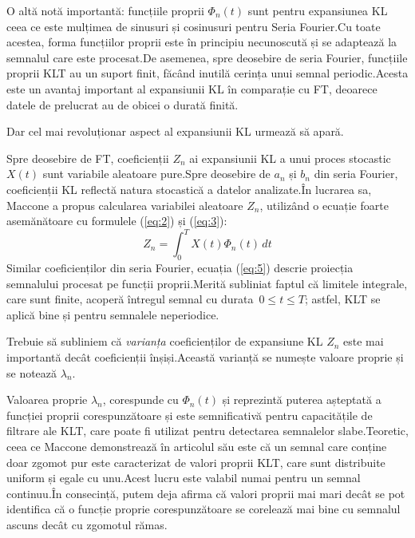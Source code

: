 \documentclass[12pt]{report}
\begin{document}
O altă notă importantă: funcțiile proprii $\Phi_n(t)$ sunt pentru expansiunea KL ceea ce este mulțimea de sinusuri și cosinusuri pentru
Seria Fourier.\@ Cu toate acestea, forma funcțiilor proprii este în principiu necunoscută și se adaptează la semnalul care este procesat.\@ De asemenea, spre deosebire de seria Fourier, funcțiile proprii KLT au un suport finit, făcând inutilă cerința unui semnal periodic.\@ Acesta este un avantaj important al expansiunii KL în comparație cu FT, deoarece datele de prelucrat au de obicei o durată finită.

Dar cel mai revoluționar aspect al expansiunii KL urmează să apară.

Spre deosebire de FT, coeficienții $Z_n$ ai expansiunii KL a unui proces stocastic $X(t)$ sunt variabile aleatoare pure.\@ Spre deosebire de $a_n$ și $b_n$ din seria Fourier, coeficienții KL reflectă natura stocastică a datelor analizate.\@ În lucrarea sa, Maccone a propus calcularea variabilei aleatoare $Z_n$, utilizând o ecuație foarte asemănătoare cu formulele (\ref{eq:2}) și (\ref{eq:3}):
\begin{equation}
	Z_n=\int_{0}^{T}X(t)\Phi_n(t)\,dt
	\label{eq:5}
\end{equation}
Similar coeficienților din seria Fourier, ecuația (\ref{eq:5}) descrie proiecția semnalului procesat pe funcții proprii.\@ Merită subliniat faptul că limitele integrale, care sunt finite, acoperă întregul semnal cu durata\ $0{\leq}t{\leq}T$; astfel, KLT se aplică bine și pentru semnalele neperiodice.

Trebuie să subliniem că \textit{varianța} coeficienților de expansiune KL $Z_n$ este mai importantă decât coeficienții înșiși.\@ Această varianță se numește valoare proprie și se notează $\lambda_n$.

Valoarea proprie $\lambda_n$, corespunde cu $\Phi_n(t)$ și reprezintă puterea așteptată a funcției proprii corespunzătoare și este semnificativă pentru capacitățile de filtrare ale KLT, care poate fi utilizat pentru detectarea semnalelor slabe.\@ Teoretic, ceea ce Maccone demonstrează în articolul său este că un semnal care conține doar zgomot pur este caracterizat de valori proprii KLT, care sunt distribuite uniform și egale cu unu.\@ Acest lucru este valabil numai pentru un semnal continuu.\@ În consecință, putem deja afirma că valori proprii mai mari decât se pot identifica că o funcție proprie corespunzătoare se corelează mai bine cu semnalul ascuns decât cu zgomotul rămas.
\end{document}
